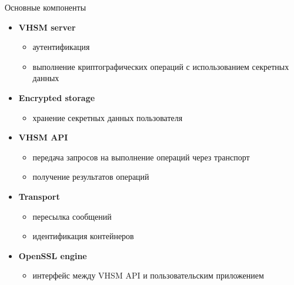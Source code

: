 \documentclass[utf8, 11pt]{beamer}
\begin{document}
\begin{frame}{Основные компоненты}
\begin{itemize}
\item {\bf VHSM server}
	\begin{itemize}
		\item аутентификация
		\item выполнение криптографических операций с использованием секретных данных
	\end{itemize}
\item {\bf Encrypted storage}
	\begin{itemize}
		\item хранение секретных данных пользователя
	\end{itemize}
\item {\bf VHSM API}
	\begin{itemize}
		\item передача запросов на выполнение операций через транспорт
		\item получение результатов операций
	\end{itemize}
\item {\bf Transport}
	\begin{itemize}
		\item пересылка сообщений
		\item идентификация контейнеров
	\end{itemize}
\item {\bf OpenSSL engine}
	\begin{itemize}
		\item интерфейс между VHSM API и пользовательским приложением
	\end{itemize}
\end{itemize}

\end{frame}
\end{document}
